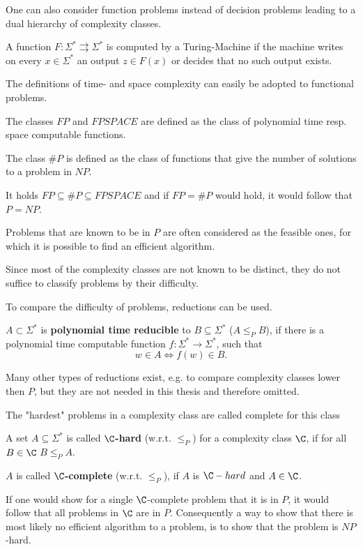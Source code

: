 		One can also consider function problems instead of decision problems
    leading to a dual hierarchy of complexity classes.
		\begin{definition}
      A function $F: \Sigma^* \rightrightarrows \Sigma^*$ is computed
      by a Turing-Machine if the machine writes on every $x \in \Sigma^*$ an output
      $z \in F(x)$ or decides that no such output exists.  
      
      The definitions of time- and space complexity can easily be adopted to
      functional problems.

      The classes $FP$ and $FPSPACE$ are defined as the class of polynomial
      time resp. space computable functions.  
      
      The class $\#P$ is defined as the class of functions that give the number
      of solutions to a problem in
      $NP$.
    \end{definition}
		It holds $FP \subseteq \#P \subseteq FPSPACE$ and if $FP = \#P$ would hold, it would follow that $P = NP$.
     
		Problems that are known to be in $P$ are often considered as the feasible
    ones, for which it is possible to find an efficient algorithm. 

    Since most of the complexity classes are not known to be distinct, they do
    not suffice to classify problems by their difficulty.

    To compare the difficulty of problems, reductions can be used.
		\begin{definition}
			$A \subset \Sigma^*$ is \textbf{polynomial time reducible} to $B \subseteq \Sigma^*$ ($A \leq_P B$), 
			if there is a polynomial time computable function $f: \Sigma^* \to \Sigma^*$, such that
			$$ w \in A \Leftrightarrow f(w) \in B.$$
		\end{definition}
		Many other types of reductions exist, e.g. to compare complexity classes
    lower then $P$, but they are not needed in this thesis and therefore
    omitted.

		The "hardest" problems in a complexity class are called complete for this class
		\begin{definition}
			A set $A \subseteq \Sigma^*$ is called \textbf{$\C$-hard} (w.r.t. $\leq_P$) for a complexity class $\C$, if for all $B \in \C$ $B \leq_P A$. 

			$A$ is called \textbf{$\C$-complete} (w.r.t. $\leq_P$), if $A$ is $\C-hard$ and $A \in \C$.  
		\end{definition}
		If one would show for a single $\C$-complete problem that it is in $P$, it would follow that all problems in $\C$ are in $P$.
		Consequently a way to show that there is most likely no efficient algorithm to a problem, is to show that the problem is $NP$-hard.


